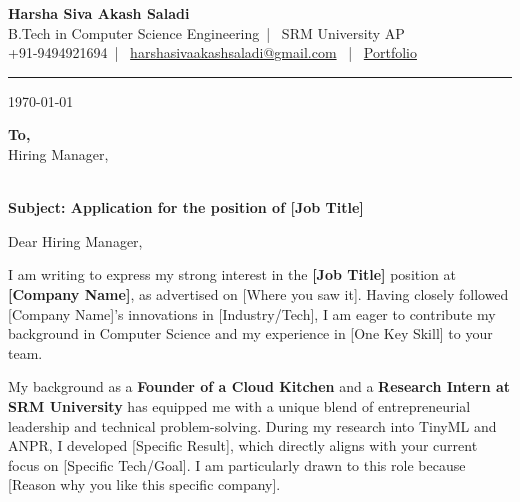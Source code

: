 \documentclass[a4paper,11pt]{article}
\makeatletter
\newcommand{\name}{Harsha Siva Akash Saladi } %
\newcommand{\course}{B.Tech in Computer Science Engineering} %
\newcommand{\phone}{9494921694} %
\newcommand{\emaild}{harshasivaakashsaladi@gmail.com} %
\makeatother
\begin{document}
\selectfont

\begin{center}
    \textbf{\LARGE \name} \\ \vspace{4pt}
    \small \course \ | \ SRM University AP \\ \vspace{2pt}
    \small +91-\phone \ | \ \href{mailto:\emaild}{\emaild} \ | \ \href{https://portfolio.hirishi.co.in/}{Portfolio} \href{https://github.com/Hirishi24}{ \faGithub} \href{https://www.linkedin.com/in/akashsaladi/}{ \faLinkedin}
\end{center}
\vspace{10pt}
\hrule
\vspace{20pt}

\hfill \today %

\vspace{10pt}

\noindent \textbf{To,} \\
Hiring Manager, \\
[Company Name] \\
[Company Address / Location]

\vspace{20pt}

\noindent \textbf{Subject: Application for the position of [Job Title]}

\vspace{20pt}

\noindent Dear Hiring Manager,

\vspace{10pt}

I am writing to express my strong interest in the \textbf{[Job Title]} position at \textbf{[Company Name]}, as advertised on [Where you saw it]. Having closely followed [Company Name]'s innovations in [Industry/Tech], I am eager to contribute my background in Computer Science and my experience in [One Key Skill] to your team.

My background as a \textbf{Founder of a Cloud Kitchen} and a \textbf{Research Intern at SRM University} has equipped me with a unique blend of entrepreneurial leadership and technical problem-solving. During my research into TinyML and ANPR, I developed [Specific Result], which directly aligns with your current focus on [Specific Tech/Goal]. I am particularly drawn to this role because [Reason why you like this specific company].
\end{document}
